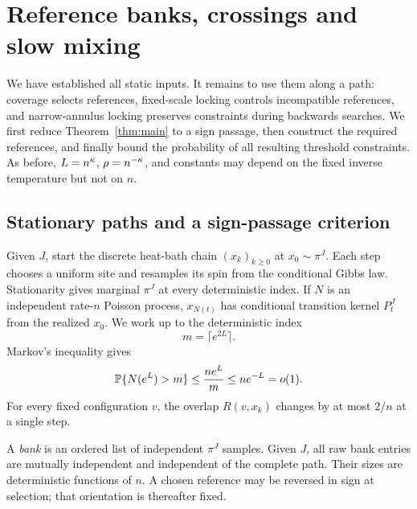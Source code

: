 \section{Reference banks, crossings and slow mixing}\label{sec:dynamics}

We have established all static inputs. It remains to use them along a path:
coverage selects references, fixed-scale locking controls incompatible
references, and narrow-annulus locking preserves constraints during
backwards searches. We first reduce Theorem~\ref{thm:main} to a sign
passage, then construct the required references, and finally bound the
probability of all resulting threshold constraints. As before,
$L=n^\kappa$, $\rho=n^{-\kappa}$, and constants may depend on the fixed
inverse temperature but not on $n$.

\subsection{Stationary paths and a sign-passage criterion}

Given $J$, start the discrete heat-bath chain $(x_k)_{k\ge0}$ at
$x_0\sim\pi^J$. Each step chooses a uniform site and resamples its spin
from the conditional Gibbs law. Stationarity gives marginal $\pi^J$
at every deterministic index. If $N$ is an independent rate-$n$ Poisson
process, $x_{N(t)}$ has conditional transition kernel $P_t^J$ from the
realized $x_0$. We work up to the deterministic index
\begin{equation}\label{eq:dyn-time-horizon}
 m=\lceil e^{2L}\rceil.
\end{equation}
Markov's inequality gives
\begin{equation}\label{eq:dyn-poisson-tail}
 \mathbb P\{N(e^L)>m\}\leq \frac{ne^L}{m}\leq ne^{-L}=o(1).
\end{equation}
For every fixed configuration $v$, the overlap $R(v,x_k)$ changes by at
most $2/n$ at a single step.

A \emph{bank} is an ordered list of independent $\pi^J$ samples. Given
$J$, all raw bank entries are mutually independent and independent of
the complete path. Their sizes are deterministic functions of $n$.
A chosen reference may be reversed in sign at selection; that
orientation is thereafter fixed.

